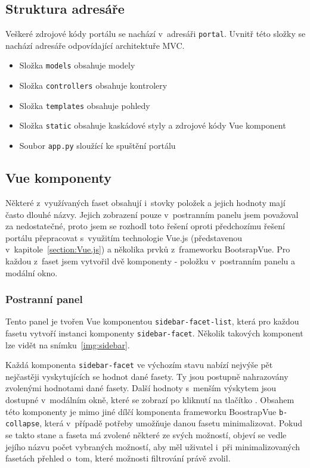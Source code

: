 \blindtext[2]

\subsection{Struktura adresáře}
Veškeré zdrojové kódy portálu se nachází v~adresáři \texttt{portal}. Uvnitř této složky se nachází adresáře odpovídající architektuře MVC.
\begin{itemize}
  \item Složka \texttt{models} obsahuje modely
  \item Složka \texttt{controllers} obsahuje kontrolery
  \item Složka \texttt{templates} obsahuje pohledy
  \item Složka \texttt{static} obsahuje kaskádové styly a zdrojové kódy Vue komponent
  \item Soubor \texttt{app.py} sloužící ke spuštění portálu
\end{itemize}

\subsection{Vue komponenty}
Některé z~využívaných faset obsahují i~stovky položek a jejich hodnoty mají často dlouhé názvy. Jejich zobrazení pouze v~postranním panelu jsem považoval za nedostatečné, proto jsem se rozhodl toto řešení oproti předchozímu řešení portálu přepracovat s~využitím technologie Vue.js (představenou v~kapitole~\ref{section:Vue.js}) a několika prvků z~frameworku BootsrapVue. Pro každou z~faset jsem vytvořil dvě komponenty - položku v~postranním panelu a modální okno.

\subsubsection*{Postranní panel}\label{section:sidebar}
Tento panel je tvořen Vue komponentou \texttt{sidebar-facet-list}, která pro každou fasetu vytvoří instanci komponenty \texttt{sidebar-facet}. Několik takových komponent lze vidět na snímku~\ref{img:sidebar}.

Každá komponenta \texttt{sidebar-facet} ve výchozím stavu nabízí nejvýše pět nejčastěji vyskytujících se hodnot dané fasety. Ty jsou postupně nahrazovány zvolenými hodnotami dané fasety. Další hodnoty s~menším výskytem jsou dostupné v~modálním okně, které se zobrazí po kliknutí na tlačítko . Obsahem této komponenty je mimo jiné dílčí komponenta frameworku BoostrapVue \texttt{b-collapse}, která v~případě potřeby umožňuje danou fasetu minimalizovat. Pokud se takto stane a faseta má zvolené některé ze svých možností, objeví se vedle jejího názvu počet vybraných možností, aby měl uživatel i~při minimalizovaných fasetách přehled o~tom, které možnosti filtrování právě zvolil.

